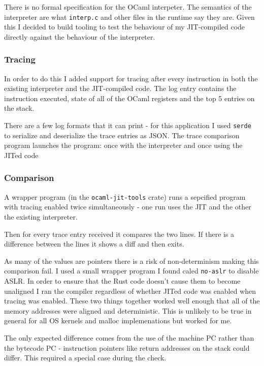 There is no formal specification for the OCaml interpeter. The semantics of the interpreter are
what
\texttt{interp.c} and other files in the runtime say they are. Given this I decided to build
tooling to test the behaviour of my JIT-compiled code directly against the behaviour of the
interpreter.

\subsubsection{Tracing}

In order to do this I added support for tracing after every instruction in both the existing
interpreter and the JIT-compiled code. The log entry contains the instruction executed, state of
all of the OCaml registers and the top 5 entries on the stack.

There are a few log formats that it can print - for this application I used \texttt{serde} to
serialize and deserialize the trace entries as JSON. The trace comparison program launches the
program: once with the interpreter and once using the JITed code

\subsubsection{Comparison}

A wrapper program (in the \texttt{ocaml-jit-tools} crate) runs a sepcified program with
tracing enabled twice simultaneously - one run uses the JIT and the other the
existing interpreter.

Then for every trace entry received it compares the two lines. If there is a difference between the
lines
it shows a diff and then exits.

As many of the values are pointers there is a risk of non-determinism making this comparison fail.
I used a small wrapper program I found caled \texttt{no-aslr} to disable ASLR. In order to ensure
that the Rust code doesn't cause them to become unaligned I ran the compiler regardless of whether
JITed code was enabled when tracing was enabled. These two things together worked well enough that
all of the memory addresses were aligned and deterministic. This is unlikely to be true in general
for all OS kernels and malloc implemenations but worked for me.

The only expected difference comes from the use of the machine PC rather than the bytecode PC -
instruction pointers like return addresses on the stack could differ. This required a special case
during the check.


